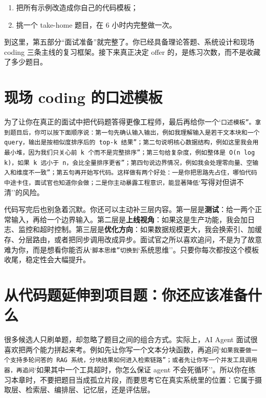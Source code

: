 \begin{enumerate}[leftmargin=2em]
\item 把所有示例改造成你自己的代码模板；
\item 挑一个 take-home 题目，在 6 小时内完整做一次。
\end{enumerate}

到这里，第五部分``面试准备''就完整了。你已经具备理论答题、系统设计和现场 coding 三条主线的复习框架。接下来真正决定 offer 的，是练习次数，而不是收藏了多少题目。


\section{现场 coding 的口述模板}

为了让你在真正的面试中把代码题答得更像工程师，最后再给你一个`\texttt{口述模板''。拿到题目后，你可以按下面顺序说：第一句先确认输入输出，例如}\texttt{我理解输入是若干文本块和一个 query，输出是按相似度排序后的 top-k 结果''；第二句说明核心数据结构，例如}\texttt{这里我会用最小堆，因为我们只关心前 k 个而不是完整排序''；第三句给复杂度，例如}\texttt{整体是 O(n log k)，如果 k 远小于 n，会比全量排序更省''；第四句说边界情况，例如}\texttt{我会处理零向量、空输入和维度不一致''；第五句再开始写代码。这样做有两个好处：一是你把思路先占住，哪怕代码中途卡住，面试官也知道你会做；二是你主动暴露工程意识，能显著降低}`写得对但讲不清''的风险。


代码写完后也别急着沉默。你还可以主动补三层内容。第一层是\textbf{测试}：给一两个正常输入，再给一个边界输入。第二层是\textbf{上线视角}：如果这是生产功能，我会加日志、监控和超时控制。第三层是\textbf{优化方向}：如果数据规模更大，我会换索引、加缓存、分层路由，或者把同步调用改成异步。面试官之所以喜欢追问，不是为了故意难为你，而是想看你能否从`\texttt{脚本思维''切换到}`系统思维''。只要你每次都按这个模板收尾，稳定性会大幅提升。


\section{从代码题延伸到项目题：你还应该准备什么}

很多候选人只刷单题，却忽略了题目之间的组合方式。实际上，AI Agent 面试很喜欢把两个能力拼起来考。例如先让你写一个文本分块函数，再追问`\texttt{如果我要做一个支持多轮问答的 RAG 系统，分块结果如何进入检索链路''；或者先让你写一个并发工具调用器，再追问}`如果其中一个工具超时，你怎么保证 agent 不会死循环''。所以你在练习本章时，不要把题目当成孤立片段，而要思考它在真实系统里的位置：它属于摄取层、检索层、编排层、记忆层，还是评估层。



